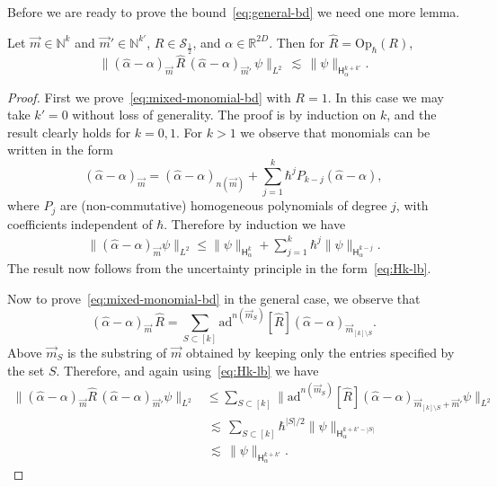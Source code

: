 \documentclass[11pt]{amsart}
\def\Sobolev{{\mathsf{H}}}
\def\bbN{{\mathbb{N}}}
\def\Op{\mathrm{Op}}
\def\ad{\mathrm{ad}}
\def\Real{{\mathbb R}}
\def\lsim{{\,\lesssim\,}}
\newcommand{\mcal}[1]{{\mathcal{#1}}}
\numberwithin{equation}{section}
\begin{document}
Before we are ready to prove the bound~\eqref{eq:general-bd} we need one more lemma.
\begin{lemma}
\label{lemma:mixed-monomial-bd}
Let $\vec{m}\in\bbN^k$ and $\vec{m}'\in\bbN^{k'}$, $R\in\mcal{S}_{\frac12}$, and $\alpha\in\Real^{2D}$.  Then for
$\hat{R}=\Op_\hbar(R)$,
\begin{equation}
\label{eq:mixed-monomial-bd}
\|(\hat{\alpha}-\alpha)_{\vec{m}}\, \hat{R} \,(\hat{\alpha}-\alpha)_{\vec{m}'} \,\psi\|_{L^2}
\lsim \|\psi\|_{\Sobolev^{k+k'}_\alpha}.
\end{equation}
\end{lemma}
\begin{proof}
First we prove~\eqref{eq:mixed-monomial-bd} with $R=1$.  In this case we may take $k'=0$ without loss of generality.  The proof
is by induction on $k$, and the result clearly holds for $k=0,1$.  For $k>1$ we observe that monomials can be written in the form
\[
(\hat{\alpha}-\alpha)_{\vec{m}} = (\hat{\alpha}-\alpha)_{n(\vec{m})} + \sum_{j=1}^k\hbar^j P_{k-j}(\hat{\alpha}-\alpha),
\]
where $P_{j}$ are (non-commutative) homogeneous polynomials of degree $j$, with coefficients independent of $\hbar$.  Therefore by induction
we have
\begin{align*}
\|(\hat{\alpha}-\alpha)_{\vec{m}}\psi\|_{L^2}
\leq \|\psi\|_{\Sobolev^k_\alpha} + \sum_{j=1}^k \hbar^j \|\psi\|_{\Sobolev^{k-j}_\alpha}.
\end{align*}
The result now follows from the uncertainty principle in the form~\eqref{eq:Hk-lb}.

Now to prove~\eqref{eq:mixed-monomial-bd} in the general case, we observe that
\[
(\hat{\alpha}-\alpha)_{\vec{m}} \,\hat{R} = \sum_{S\subset[k]} \ad^{n(\vec{m}_S)}[\hat{R}] (\hat{\alpha}-\alpha)_{\vec{m}_{[k]\setminus S}}.
\]
Above $\vec{m}_S$ is the substring of $\vec{m}$ obtained by keeping only the entries specified by the set $S$.  Therefore,
and again using~\eqref{eq:Hk-lb} we have
\begin{align*}
\|(\hat{\alpha}-\alpha)_{\vec{m}} \hat{R}\,(\hat{\alpha}-\alpha)_{\vec{m}'}\psi\|_{L^2}
&\leq \sum_{S\subset[k]}
\|\ad^{n(\vec{m}_S)}[\hat{R}](\hat{\alpha}-\alpha)_{\vec{m}_{[k]\setminus S} + \vec{m}'}\psi\|_{L^2} \\
&\lsim \sum_{S\subset[k]} \hbar^{|S|/2} \|\psi\|_{\Sobolev^{k+k'-|S|}_\alpha} \\
&\lsim \|\psi\|_{\Sobolev^{k+k'}_\alpha}.
\end{align*}
\end{proof}
\end{document}
